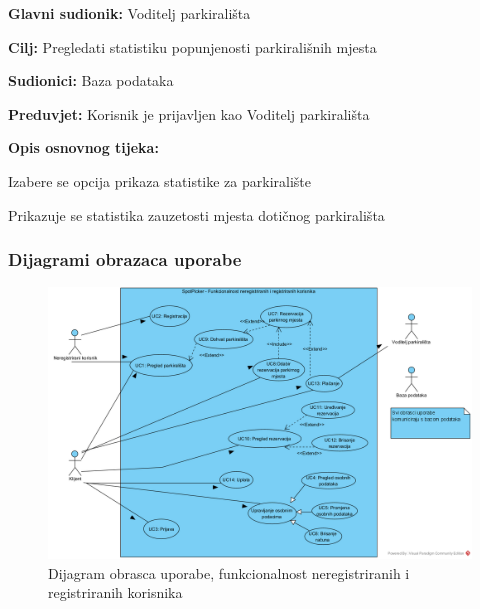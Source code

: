                         \noindent {}
					\begin{packed_item}
	
						\item \textbf{Glavni sudionik: }Voditelj parkirališta
						\item  \textbf{Cilj:} Pregledati statistiku popunjenosti parkirališnih mjesta
						\item  \textbf{Sudionici:} Baza podataka
						\item  \textbf{Preduvjet:} Korisnik je prijavljen kao Voditelj parkirališta
						\item  \textbf{Opis osnovnog tijeka:}
						
						\item[] \begin{packed_enum}
	
							\item Izabere se opcija prikaza statistike za parkiralište
							\item Prikazuje se statistika zauzetosti mjesta dotičnog parkirališta
							
							
						\end{packed_enum}

					\end{packed_item}


				
					
				\subsubsection{Dijagrami obrazaca uporabe}
					

					\begin{figure}[H]
						\centering
						\includegraphics[width=\textwidth]{slike/UCD1.PNG} 
						\caption{Dijagram obrasca uporabe, funkcionalnost neregistriranih i registriranih korisnika}
						\label{fig:promjene6} 
					\end{figure}
					
